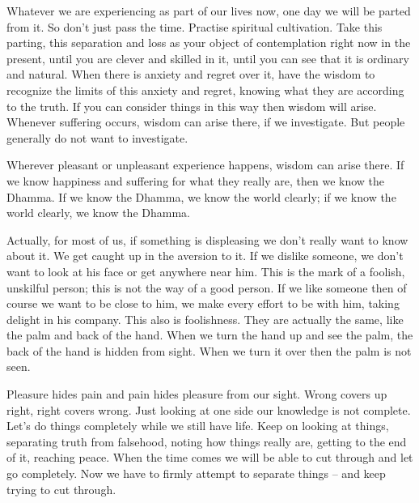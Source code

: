 Whatever we are experiencing as part of our lives now, one day we will be parted from it. So don't just pass the time. Practise spiritual cultivation. Take this parting, this separation and loss as your object of contemplation right now in the present, until you are clever and skilled in it, until you can see that it is ordinary and natural. When there is anxiety and regret over it, have the wisdom to recognize the limits of this anxiety and regret, knowing what they are according to the truth. If you can consider things in this way then wisdom will arise. Whenever suffering occurs, wisdom can arise there, if we investigate. But people generally do not want to investigate. 

Wherever pleasant or unpleasant experience happens, wisdom can arise there. If we know happiness and suffering for what they really are, then we know the Dhamma. If we know the Dhamma, we know the world clearly; if we know the world clearly, we know the Dhamma. 

Actually, for most of us, if something is displeasing we don't really want to know about it. We get caught up in the aversion to it. If we dislike someone, we don't want to look at his face or get anywhere near him. This is the mark of a foolish, unskilful person; this is not the way of a good person. If we like someone then of course we want to be close to him, we make every effort to be with him, taking delight in his company. This also is foolishness. They are actually the same, like the palm and back of the hand. When we turn the hand up and see the palm, the back of the hand is hidden from sight. When we turn it over then the palm is not seen.

Pleasure hides pain and pain hides pleasure from our sight. Wrong covers up right, right covers wrong. Just looking at one side our knowledge is not complete. Let's do things completely while we still have life. Keep on looking at things, separating truth from falsehood, noting how things really are, getting to the end of it, reaching peace. When the time comes we will be able to cut through and let go completely. Now we have to firmly attempt to separate things -- and keep trying to cut through. 

